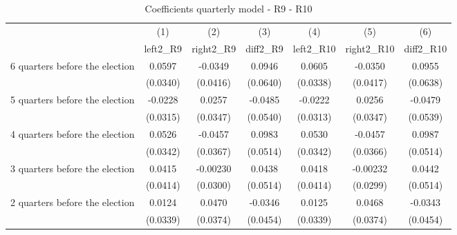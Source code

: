 \begin{table}[!ht]\centering \footnotesize
\def\sym#1{\ifmmode^{#1}\else\(^{#1}\)\fi}
\caption{Coefficients quarterly model - R9 - R10}
\begin{tabular}{l*{6}{c}}
\hline\hline
                    &\multicolumn{1}{c}{(1)}&\multicolumn{1}{c}{(2)}&\multicolumn{1}{c}{(3)}&\multicolumn{1}{c}{(4)}&\multicolumn{1}{c}{(5)}&\multicolumn{1}{c}{(6)}\\
                    &\multicolumn{1}{c}{left2\_R9}&\multicolumn{1}{c}{right2\_R9}&\multicolumn{1}{c}{diff2\_R9}&\multicolumn{1}{c}{left2\_R10}&\multicolumn{1}{c}{right2\_R10}&\multicolumn{1}{c}{diff2\_R10}\\
\hline
 6 quarters before the election&      0.0597         &     -0.0349         &      0.0946         &      0.0605         &     -0.0350         &      0.0955         \\
                    &    (0.0340)         &    (0.0416)         &    (0.0640)         &    (0.0338)         &    (0.0417)         &    (0.0638)         \\
[1em]
 5 quarters before the election&     -0.0228         &      0.0257         &     -0.0485         &     -0.0222         &      0.0256         &     -0.0479         \\
                    &    (0.0315)         &    (0.0347)         &    (0.0540)         &    (0.0313)         &    (0.0347)         &    (0.0539)         \\
[1em]
 4 quarters before the election&      0.0526         &     -0.0457         &      0.0983         &      0.0530         &     -0.0457         &      0.0987         \\
                    &    (0.0342)         &    (0.0367)         &    (0.0514)         &    (0.0342)         &    (0.0366)         &    (0.0514)         \\
[1em]
 3 quarters before the election&      0.0415         &    -0.00230         &      0.0438         &      0.0418         &    -0.00232         &      0.0442         \\
                    &    (0.0414)         &    (0.0300)         &    (0.0514)         &    (0.0414)         &    (0.0299)         &    (0.0514)         \\
[1em]
 2 quarters before the election&      0.0124         &      0.0470         &     -0.0346         &      0.0125         &      0.0468         &     -0.0343         \\
                    &    (0.0339)         &    (0.0374)         &    (0.0454)         &    (0.0339)         &    (0.0374)         &    (0.0454)         \\

\end{tabular}
\end{table}
